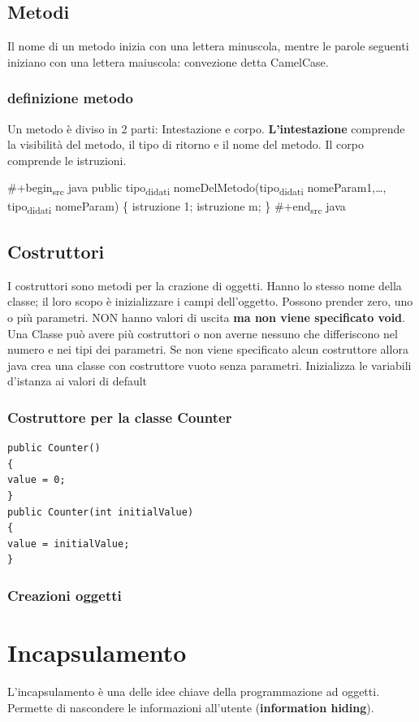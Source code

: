 \documentclass[11pt]{article}
\begin{document}
\subsection{Metodi}
\label{sec:org4645266}
Il nome di un metodo inizia con una lettera minuscola, mentre le parole seguenti iniziano con una lettera maiuscola: convezione detta CamelCase.
\subsubsection{definizione metodo}
\label{sec:org394a2d7}
Un metodo è diviso in 2 parti: Intestazione e corpo.
\textbf{L'intestazione} comprende la visibilità del metodo, il tipo di ritorno e il nome del metodo. Il corpo comprende le istruzioni.

\#+begin\textsubscript{src} java
public tipo\textsubscript{di}\textsubscript{dati} nomeDelMetodo(tipo\textsubscript{di}\textsubscript{dati} nomeParam1,\ldots{}, tipo\textsubscript{di}\textsubscript{dati} nomeParam)
\{
istruzione 1;
istruzione m;
\}
\#+end\textsubscript{src} java
\subsection{Costruttori}
\label{sec:orgd5c20fd}
I costruttori sono metodi per la crazione di oggetti. Hanno lo stesso nome della classe; il loro scopo è inizializzare i campi dell'oggetto. Possono prender zero, uno o più parametri. NON hanno valori di uscita \textbf{ma non viene specificato void}. Una Classe può avere più costruttori o non averne nessuno che differiscono nel numero e nei tipi dei parametri.
Se non viene specificato alcun costruttore allora java crea una classe con costruttore vuoto senza parametri. Inizializza le variabili d'istanza ai valori di default
\subsubsection{Costruttore per la classe Counter}
\label{sec:orgf23952f}
\begin{verbatim}
public Counter()
{
value = 0;
}
public Counter(int initialValue)
{
value = initialValue;
}
\end{verbatim}
\subsubsection{Creazioni oggetti}
\label{sec:org7ae6c72}
\section{Incapsulamento}
\label{sec:org0ec678e}
L'incapsulamento è una delle idee chiave della programmazione ad oggetti. Permette di nascondere le informazioni all'utente (\textbf{information hiding}).
\end{document}
